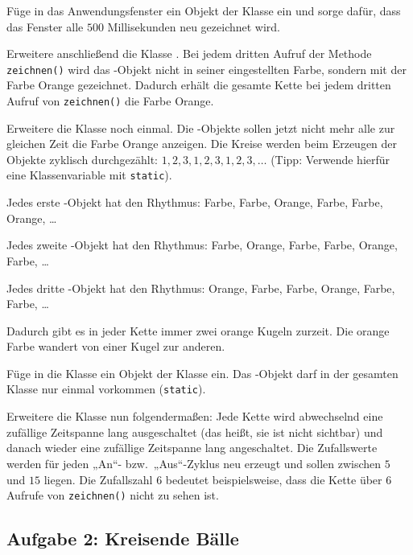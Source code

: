 \begin{compactenum}[a)]
\item Füge in das Anwendungsfenster ein Objekt der Klasse  ein
und sorge dafür, dass das Fenster alle $500$ Millisekunden neu gezeichnet wird.

Erweitere anschließend die Klasse . Bei jedem dritten Aufruf der
Methode \lstinline|zeichnen()| wird das -Objekt nicht in seiner
eingestellten Farbe, sondern mit der Farbe Orange gezeichnet. Dadurch erhält
die gesamte Kette bei jedem dritten Aufruf von \lstinline|zeichnen()| die Farbe
Orange.

\item Erweitere die Klasse  noch einmal. Die
-Objekte sollen jetzt nicht mehr alle zur gleichen Zeit die
Farbe Orange anzeigen. Die Kreise werden beim Erzeugen der Objekte zyklisch
durchgezählt: $1, 2, 3, 1, 2, 3, 1, 2, 3, \ldots$ (Tipp: Verwende hierfür eine
Klassenvariable mit \lstinline|static|).

Jedes erste -Objekt hat den Rhythmus: Farbe, Farbe, Orange,
Farbe, Farbe, Orange, \ldots

Jedes zweite -Objekt hat den Rhythmus: Farbe, Orange, Farbe,
Farbe, Orange, Farbe, \ldots

Jedes dritte -Objekt hat den Rhythmus: Orange, Farbe, Farbe,
Orange, Farbe, Farbe, \ldots

Dadurch gibt es in jeder Kette immer zwei orange Kugeln zurzeit. Die orange
Farbe wandert von einer Kugel zur anderen.

\item Füge in die Klasse  ein Objekt der Klasse 
ein. Das -Objekt darf in der gesamten Klasse 
nur einmal vorkommen (\lstinline|static|).

Erweitere die Klasse  nun folgendermaßen: Jede Kette wird
abwechselnd eine zufällige Zeitspanne lang ausgeschaltet (das heißt, sie ist
nicht sichtbar) und danach wieder eine zufällige Zeitspanne lang
angeschaltet. Die Zufallswerte werden für jeden „An“- bzw.\ „Aus“-Zyklus neu
erzeugt und sollen zwischen $5$ und $15$ liegen. Die Zufallszahl $6$ bedeutet
beispielsweise, dass die Kette über $6$ Aufrufe von \lstinline|zeichnen()|
nicht zu sehen ist.

\end{compactenum}


\subsection{Aufgabe 2: Kreisende Bälle}

